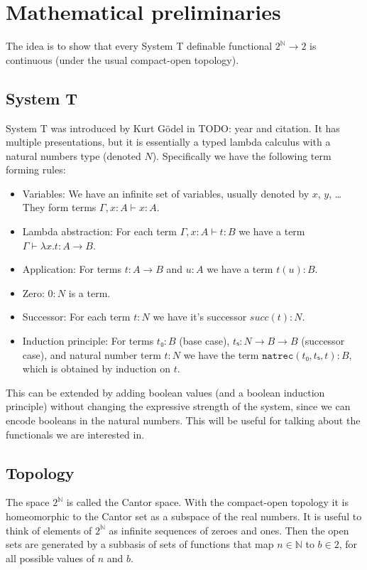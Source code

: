 \documentclass{article}
\def\natrec{\texttt{natrec}}
\begin{document}
\section{Mathematical preliminaries}

The idea is to show that every System T definable functional \(2^ℕ → 2\) is
continuous (under the usual compact-open topology).

\subsection{System T}
System T was introduced by Kurt Gödel in TODO: year and citation. It has
multiple presentations, but it is essentially a typed lambda calculus with a
natural numbers type (denoted \(N\)). Specifically we have the following term forming rules:
\begin{itemize}
\item Variables: We have an infinite set of variables, usually denoted by \(x\),
  \(y\), … They form terms \(Γ, x : A ⊢ x : A\).
\item Lambda abstraction: For each term \(Γ, x : A ⊢ t : B\) we have a term
  \(Γ ⊢ λx. t : A → B\).
\item Application: For terms \(t : A → B\) and \(u : A\) we have a term \(t(u) : B\).
\item Zero: \(0 : N\) is a term.
\item Successor: For each term \(t : N\) we have it's successor \(succ(t) : N\).
\item Induction principle: For terms \(t₀ : B\) (base case), \({tₛ : N → B → B}\)
  (successor case), and natural number term \(t : N\) we have the term
  \({\natrec(t₀, tₛ, t) : B}\), which is obtained by induction on \(t\).
\end{itemize}

This can be extended by adding boolean values (and a boolean induction
principle) without changing the expressive strength of the system, since we can
encode booleans in the natural numbers.
This will be useful for talking about the functionals we are interested in.

\subsection{Topology}
The space \(2^ℕ\) is called the Cantor space. With the compact-open topology
it is homeomorphic to the Cantor set as a subspace of the real numbers.
It is useful to think of elements of \(2^ℕ\) as infinite sequences of zeroes and
ones. Then the open sets are generated by a subbasis of sets of functions that
map \(n ∈ ℕ\) to \(b ∈ 2\), for all possible values of \(n\) and \(b\).
\end{document}
